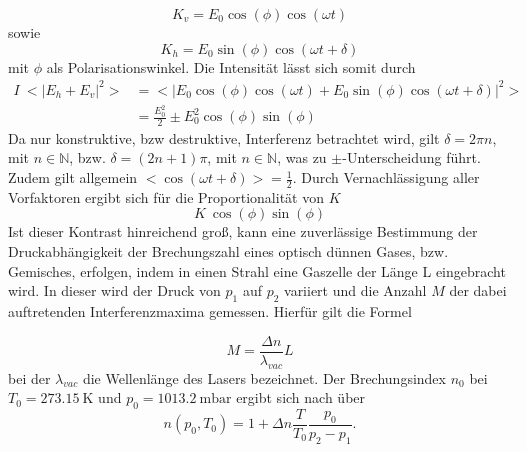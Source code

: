 \begin{equation}
	K_v = E_0 \cos (\phi) \cos(\omega t)
\end{equation}
sowie
\begin{equation}
	K_h = E_0 \sin(\phi) \cos(\omega t + \delta)
\end{equation}
mit $\phi$ als Polarisationswinkel. Die Intensität lässt sich somit durch
\begin{align*}
	I ~ <|E_h+E_v|^2> &=<| E_0 \cos (\phi) \cos(\omega t) +  E_0 \sin(\phi) \cos(\omega t + \delta)|^2> \\
			       &= \frac{E_0^2}{2} \pm E_0^2 \cos(\phi)\sin(\phi)
\end{align*}
Da nur konstruktive, bzw destruktive, Interferenz betrachtet wird, gilt $\delta = 2\pi n$, mit $n \in \mathbb{N}$, bzw. $\delta = (2n+1)\pi$, mit $n \in \mathbb{N}$, was zu $\pm$-Unterscheidung führt. Zudem gilt allgemein $<\cos(\omega t + \delta)> = \frac{1}{2}$.
Durch Vernachlässigung aller Vorfaktoren ergibt sich für die Proportionalität von $K$
\begin{equation}
	K ~ \cos(\phi)\sin(\phi)
\end{equation}
Ist dieser Kontrast hinreichend groß, kann eine zuverlässige Bestimmung der Druckabhängigkeit der Brechungszahl eines optisch dünnen Gases, bzw. Gemisches, erfolgen, indem in einen Strahl eine Gaszelle der Länge L eingebracht wird. In dieser wird der Druck von $p_1$ auf $p_2$ variiert und die Anzahl $M$ der dabei auftretenden Interferenzmaxima gemessen. Hierfür gilt die Formel

\begin{equation}
	M = \frac{\Delta n}{\lambda_{vac}} L
\end{equation}
bei der $\lambda_{vac}$ die Wellenlänge des Lasers bezeichnet.
Der Brechungsindex $n_0$ bei $T_0 = \SI{273,15}{\kelvin}$ und $p_0 =  \SI{1013,2}{\milli\bar}$ ergibt sich nach \cite{AltAnleitung} über
\begin{equation}
	n(p_0,T_0)=1+ \Delta n \frac{T}{T_0} \frac{p_0}{p_2-p_1}.
	\label{eqn:n0}
\end{equation}

